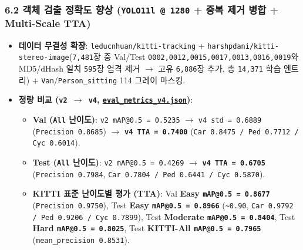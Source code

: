 \documentclass[10.5pt,a4paper]{article}
\begin{document}
\subsubsection{6.2 객체 검출 정확도 향상 (\texttt{YOLO11l @ 1280} + 중복 제거 병합 + Multi-Scale TTA)}
\begin{itemize}[leftmargin=1.5em,itemsep=2pt]
\item \textbf{데이터 무결성 확장}: \texttt{leducnhuan/\allowbreak{}kitti-\allowbreak{}tracking} + \texttt{harshpdani/\allowbreak{}kitti-\allowbreak{}stereo-\allowbreak{}image}(\texttt{7,\allowbreak{}481}장 중 Val/Test \texttt{0002,\allowbreak{}0012,\allowbreak{}0015,\allowbreak{}0017,\allowbreak{}0013,\allowbreak{}0016,\allowbreak{}0019}와 MD5/dHash 일치 \texttt{595}장 엄격 제거 $\rightarrow$ 고유 \texttt{6,\allowbreak{}886}장 추가, 총 \texttt{14,\allowbreak{}371} 학습 엔트리) + \texttt{Van}/\texttt{Person\_\allowbreak{}sitting} 114 그레이 마스킹.
\item \textbf{정량 비교 (\texttt{v2 $\rightarrow$ v4}, \href{https://github.com/Heisnotanimposter/Totalcare\_autonomous\_driving\_Yolov5/blob/main/results/v4\_road\_lane/detect\_outputs/outputs/eval\_metrics\_v4.json}{\texttt{eval\_\allowbreak{}metrics\_\allowbreak{}v4.\allowbreak{}json}})}:
\begin{itemize}[leftmargin=1.5em,itemsep=2pt]
\item \textbf{Val (\texttt{All} 난이도)}: \texttt{v2 mAP@0.\allowbreak{}5 = 0.\allowbreak{}5235} $\rightarrow$ \texttt{v4 std = 0.\allowbreak{}6889} (\texttt{Precision 0.\allowbreak{}8685}) $\rightarrow$ \textbf{\texttt{v4 TTA = 0.\allowbreak{}7400}} (\texttt{Car 0.\allowbreak{}8475 /\allowbreak{} Ped 0.\allowbreak{}7712 /\allowbreak{} Cyc 0.\allowbreak{}6014}).
\item \textbf{Test (\texttt{All} 난이도)}: \texttt{v2 mAP@0.\allowbreak{}5 = 0.\allowbreak{}4269} $\rightarrow$ \textbf{\texttt{v4 TTA = 0.\allowbreak{}6705}} (\texttt{Precision 0.\allowbreak{}7984}, \texttt{Car 0.\allowbreak{}7804 /\allowbreak{} Ped 0.\allowbreak{}6441 /\allowbreak{} Cyc 0.\allowbreak{}5870}).
\item \textbf{KITTI 표준 난이도별 평가 (TTA)}: Val \textbf{Easy \texttt{mAP@0.\allowbreak{}5 = 0.\allowbreak{}8677}} (\texttt{Precision 0.\allowbreak{}9750}), Test \textbf{Easy \texttt{mAP@0.\allowbreak{}5 = 0.\allowbreak{}8966}} (\texttt{\textasciitilde{}0.\allowbreak{}90}, \texttt{Car 0.\allowbreak{}9792 /\allowbreak{} Ped 0.\allowbreak{}9206 /\allowbreak{} Cyc 0.\allowbreak{}7899}), Test \textbf{Moderate \texttt{mAP@0.\allowbreak{}5 = 0.\allowbreak{}8404}}, Test \textbf{Hard \texttt{mAP@0.\allowbreak{}5 = 0.\allowbreak{}8025}}, Test \textbf{KITTI-All \texttt{mAP@0.\allowbreak{}5 = 0.\allowbreak{}7965}} (\texttt{mean\_\allowbreak{}precision 0.\allowbreak{}8531}).

\end{itemize}
\end{itemize}
\end{document}
